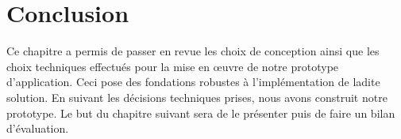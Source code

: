 \section*{Conclusion}
Ce chapitre a permis de passer en revue les choix de conception ainsi que les choix techniques effectués
pour la mise en œuvre de notre prototype d’application. 
Ceci pose des fondations robustes à l'implémentation de ladite solution. En suivant les décisions techniques prises, 
nous avons construit notre prototype. 
Le but du chapitre suivant sera de le présenter puis de faire un bilan d'évaluation.
